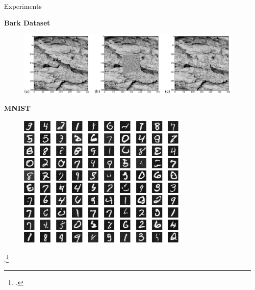 \documentclass[aspectratio=169, 10pt]{beamer}
\theoremstyle{definition}
\begin{document}
\begin{frame}{Experiments}
  \begin{minipage}[h!]{0.5\textwidth}
    \begin{center}
      \bf
      Bark Dataset
    \end{center}
    \begin{figure}[h!]
      \centering
      \includegraphics[width=\textwidth]{./pic/bark.png}
    \end{figure}
  \end{minipage}\hfill%
  \begin{minipage}[h!]{0.5\textwidth}

    \begin{center}
      \bf MNIST
    \end{center}
    \begin{figure}[h!]
      \centering
      \includegraphics[width=0.75\textwidth]{./pic/mnist_thermo.png}
    \end{figure}
  \end{minipage}
  \vfill .\footcite{thermodynamic}
\end{frame}
\end{document}
